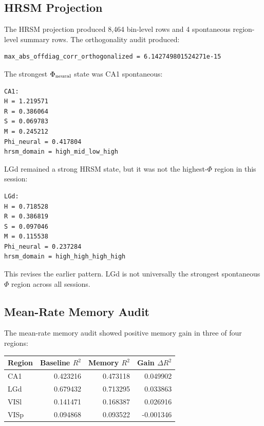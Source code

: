 \subsection{HRSM Projection}

The HRSM projection produced 8,464 bin-level rows and 4 spontaneous region-level summary rows. The orthogonality audit produced:

\begin{verbatim}
max_abs_offdiag_corr_orthogonalized = 6.142749801524271e-15
\end{verbatim}

The strongest \(\Phi_{\rm neural}\) state was CA1 spontaneous:

\begin{verbatim}
CA1:
H = 1.219571
R = 0.386064
S = 0.069783
M = 0.245212
Phi_neural = 0.417804
hrsm_domain = high_mid_low_high
\end{verbatim}

LGd remained a strong HRSM state, but it was not the highest-\(\Phi\) region in this session:

\begin{verbatim}
LGd:
H = 0.718528
R = 0.386819
S = 0.097046
M = 0.115538
Phi_neural = 0.237284
hrsm_domain = high_high_high_high
\end{verbatim}

This revises the earlier pattern. LGd is not universally the strongest spontaneous \(\Phi\) region across all sessions.

\subsection{Mean-Rate Memory Audit}

The mean-rate memory audit showed positive memory gain in three of four regions:

\begin{center}
\begin{tabular}{lrrr}
\hline
Region & Baseline \(R^2\) & Memory \(R^2\) & Gain \(\Delta R^2\) \\
\hline
CA1 & 0.423216 & 0.473118 & 0.049902 \\
LGd & 0.679432 & 0.713295 & 0.033863 \\
VISl & 0.141471 & 0.168387 & 0.026916 \\
VISp & 0.094868 & 0.093522 & -0.001346 \\
\hline
\end{tabular}
\end{center}

